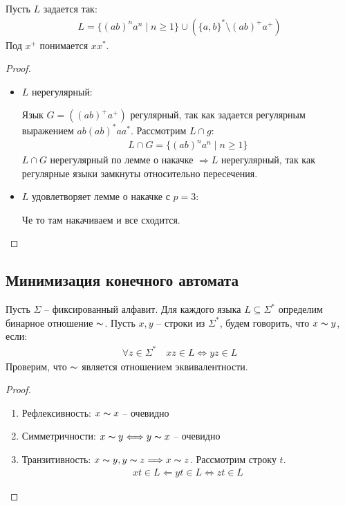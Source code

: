 Пусть $L$ задается так:
\begin{gather*}
    L = \{(ab)^n a^n \mid n \geqslant 1\} \cup \left( \{a, b\}^* \setminus (ab)^+ a^+ \right)
\end{gather*}
Под $x^+$ понимается $x x^*$. 
\begin{proof} \quad

    \begin{itemize}
        \item $L$ нерегулярный: 
        
        Язык $G = ((ab)^+ a^+)$ регулярный, так как задается регулярным выражением $ab(ab)^* a a^*$. Рассмотрим $L \cap g$:
        \begin{gather*}
            L \cap G = \{ (ab)^n a^n \mid n \geqslant 1 \}
        \end{gather*}
        $L \cap G$ нерегулярный по лемме о накачке $\Longrightarrow L$ нерегулярный, так как регулярные языки замкнуты относительно пересечения. 
        \item $L$ удовлетворяет лемме о накачке с $p = 3$:
        
        Че то там накачиваем и все сходится.
    \end{itemize}
\end{proof}

\subsection{Минимизация конечного автомата}

Пусть $\Sigma$ -- фиксированный алфавит. Для каждого языка $L \subseteq \Sigma^*$ определим бинарное отношение $\thicksim$. Пусть $x, y$ -- строки из $\Sigma^*$, будем говорить, что $x \thicksim y$, если:
\begin{gather*}
    \forall z \in \Sigma^* \quad xz \in L \Longleftrightarrow yz \in L
\end{gather*}
Проверим, что $\thicksim$ является отношением эквивалентности. 
\begin{proof} \quad

    \begin{enumerate}
        \item Рефлексивность: $x \thicksim x$ -- очевидно 
        \item Симметричности: $x \thicksim y \Longleftrightarrow y \thicksim x$ -- очевидно 
        \item Транзитивность: $x \thicksim y, y \thicksim z \Longrightarrow x \thicksim z$. Рассмотрим строку $t$. 
        \begin{gather*}
            xt \in L \Longleftarrow yt \in L \Longleftrightarrow zt \in L
        \end{gather*}
    \end{enumerate}
\end{proof}

